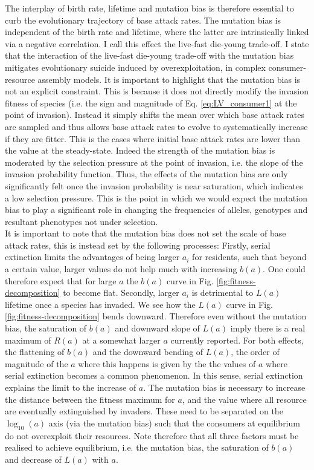\documentclass[a4paper]{report}
\DeclareMathOperator{\log}{log}
\begin{document}
{The interplay of birth rate, lifetime and mutation bias is therefore essential to curb the evolutionary trajectory of base attack rates. The mutation bias is independent of the birth rate and lifetime, where the latter are intrinsically linked via a negative correlation. I call this effect the  live-fast die-young trade-off. I state that the interaction of the live-fast die-young trade-off with the mutation bias mitigates evolutionary suicide induced by overexploitation, in complex consumer-resource assembly models. It is important to highlight that the mutation bias is not an explicit constraint. This is because it does not directly modify the invasion fitness of species (i.e. the sign and magnitude of Eq. \eqref{eq:LV_consumer1} at the point of invasion). Instead it simply shifts the mean over which base attack rates are sampled and thus allows base attack rates to evolve to systematically increase if they are fitter. This is the cases where initial base attack rates are lower than the value at the steady-state. Indeed the strength of the mutation bias is moderated by the selection pressure at the point of invasion, i.e. the slope of the invasion probability function. Thus, the effects of the mutation bias are only significantly felt once the invasion probability is near saturation, which indicates a low selection pressure. This is the point in which we would expect the mutation bias to play a significant role in changing the frequencies of alleles, genotypes and resultant phenotypes not under selection.\\

 It is important to note that the mutation bias does not set the scale of base attack rates, this is instead set by the following  processes: Firstly, serial extinction limits the advantages of being larger $a_i$ for residents, such that beyond a certain value, larger values do not help much with increasing $b(a)$. One could therefore expect that for large $a$ the $b(a)$ curve in Fig. \ref{fig:fitness-decomposition} to become flat. Secondly, larger $a_i$ is detrimental to $L(a)$ lifetime once a species has invaded. We see how the $L(a)$ curve in Fig. \ref{fig:fitness-decomposition} bends downward. Therefore even without the mutation bias, the saturation of $b(a)$ and downward slope of $L(a)$ imply there is a real maximum of $R(a)$ at a somewhat larger $a$ currently reported. For both effects, the flattening of $b(a)$ and the downward bending of $L(a)$, the order of magnitude of the $a$ where this happens is given by the the values of $a$ where serial extinction becomes a common phenomenon. In this sense, serial extinction explains the limit to the increase of $a$. The mutation bias is necessary to increase the distance between the fitness maximum for $a$, and the value where all resource are eventually extinguished by invaders. These need to be separated on the $\log_{10}(a)$ axis (via the mutation bias) such that the consumers at equilibrium do not overexploit their resources. Note therefore that all three factors must be realised to achieve equilibrium, i.e. the mutation bias, the saturation of $b(a)$ and decrease of $L(a)$ with $a$.\\

}
\end{document}
